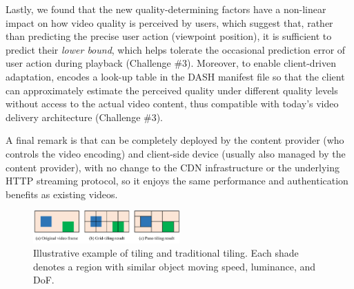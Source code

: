 Lastly, we found that the new quality-determining factors have a non-linear impact on how video quality is perceived by users, which suggest that, rather than predicting the precise user action (\eg viewpoint position), it is sufficient to predict their {\em lower bound}, which helps tolerate the occasional prediction error of user action during playback (Challenge \#3).
Moreover, to enable client-driven adaptation, \name encodes a look-up table in the DASH manifest file so that the client can approximately estimate the perceived quality under different quality levels without access to the actual video content, thus compatible with today's video delivery architecture (Challenge \#3).


A final remark is that \name can be completely deployed by the content provider (who controls the video encoding) and client-side device (usually also managed by the content provider), with no change to the CDN infrastructure or the underlying HTTP streaming protocol, so it enjoys the same performance and authentication benefits as existing videos.


\begin{figure}
  \centering
  \includegraphics[width=0.5\textwidth]{figures/tiling.pdf}
  \caption{Illustrative example of \name tiling and traditional tiling. Each shade denotes a region with similar object moving speed, luminance, and DoF.}
  \label{fig:tiling}
 \end{figure}




